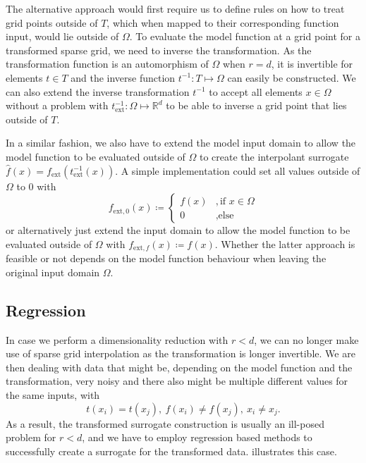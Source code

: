 \documentclass[
  a4paper,  %
  twoside,  %
  bibliography=totoc,
  headsepline,
  cleardoublepage=empty,
  parskip=half,
  draft=false
]{scrbook}
\begin{document}
The alternative approach would first require us to define rules on how to treat grid points outside of $T$, which when mapped to their corresponding function input, would lie outside of $\Omega$.
To evaluate the model function at a grid point for a transformed sparse grid, we need to inverse the transformation.
As the transformation function is an automorphism of $\Omega$ when $r=d$, it is invertible for elements $t \in T$ and the inverse function $t^{-1} \colon T \mapsto \Omega$ can easily be constructed.
We can also extend the inverse transformation $t^{-1}$ to accept all elements $x \in \Omega$ without a problem with $t^{-1}_{\text{ext}} \colon \Omega \mapsto \mathds{R}^d$ to be able to inverse a grid point that lies outside of $T$.

In a similar fashion, we also have to extend the model input domain to allow the model function to be evaluated outside of $\Omega$ to create the interpolant surrogate $\hat{f}(x)=f_\text{ext}(t^{-1}_{\text{ext}}(x))$.
A simple implementation could set all values outside of $\Omega$ to 0 with
\begin{equation}
f_{\text{ext}, 0}(x) \coloneqq \begin{cases}
f(x)&, \text{if $x \in \Omega$}\\
0&,\text{else}
\end{cases}
\end{equation}
or alternatively just extend the input domain to allow the model function to be evaluated outside of $\Omega$ with $f_{\text{ext}, f}(x) \coloneqq f(x)$.
Whether the latter approach is feasible or not depends on the model function behaviour when leaving the original input domain $\Omega$.

\subsection{Regression}
In case we perform a dimensionality reduction with $r < d$, we can no longer make use of sparse grid interpolation as the transformation is longer invertible.
We are then dealing with data that might be, depending on the model function and the transformation, very noisy and there also might be multiple different values for the same inputs, with
\begin{equation}
t(x_i)=t(x_j), ~ f(x_i) \neq f(x_j), ~ x_i \neq x_j.
\end{equation}
As a result, the transformed surrogate construction is usually an ill-posed problem for $r < d$, and we have to employ regression based methods to successfully create a surrogate for the transformed data.
 illustrates this case.
\end{document}
